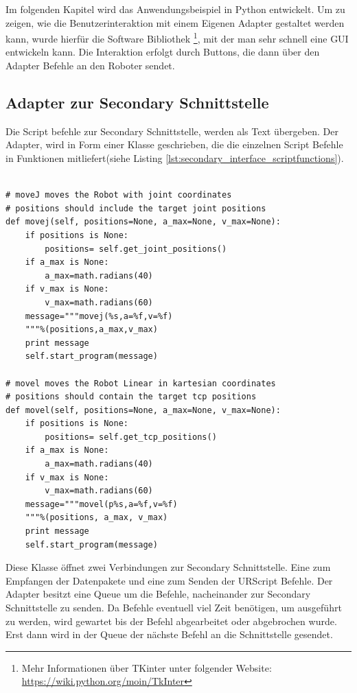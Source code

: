 Im folgenden Kapitel wird das Anwendungsbeispiel in Python entwickelt. Um zu zeigen, wie die Benutzerinteraktion mit einem Eigenen Adapter gestaltet werden kann, wurde hierfür die Software Bibliothek \footnote{Mehr Informationen über TKinter unter folgender Website: \url{https://wiki.python.org/moin/TkInter}}, mit der man sehr schnell eine \ac{GUI} entwickeln kann. Die Interaktion erfolgt durch Buttons, die dann über den Adapter Befehle an den Roboter sendet.

\subsection{Adapter zur Secondary Schnittstelle}
\label{beschreibung_script_hoeher_schicht}

Die Script befehle zur Secondary Schnittstelle, werden als Text übergeben. Der Adapter, wird in Form einer Klasse geschrieben, die die einzelnen Script Befehle in Funktionen mitliefert(siehe Listing \ref{lst:secondary_interface_scriptfunctions}).

\begin{lstlisting}[caption={Ausschnitt zeigt Funktionen die Scriptbefehle in der Adapter Klasse umgesetzt}, label=lst:urscipt_program_lst ,captionpos=b]

# moveJ moves the Robot with joint coordinates
# positions should include the target joint positions
def movej(self, positions=None, a_max=None, v_max=None):
    if positions is None:
        positions= self.get_joint_positions()
    if a_max is None:
        a_max=math.radians(40)
    if v_max is None:
        v_max=math.radians(60)
    message="""movej(%s,a=%f,v=%f)
    """%(positions,a_max,v_max)
    print message
    self.start_program(message)

# movel moves the Robot Linear in kartesian coordinates
# positions should contain the target tcp positions
def movel(self, positions=None, a_max=None, v_max=None):
    if positions is None:
        positions= self.get_tcp_positions()
    if a_max is None:
        a_max=math.radians(40)
    if v_max is None:
        v_max=math.radians(60)
    message="""movel(p%s,a=%f,v=%f)
    """%(positions, a_max, v_max)
    print message
    self.start_program(message)
\end{lstlisting}

Diese Klasse öffnet zwei Verbindungen zur Secondary Schnittstelle. Eine zum Empfangen der Datenpakete und eine zum Senden der URScript Befehle. Der Adapter besitzt eine \ac{Queue} um die Befehle, nacheinander zur Secondary Schnittstelle zu senden. Da Befehle eventuell viel Zeit benötigen, um ausgeführt zu werden, wird gewartet bis der Befehl abgearbeitet oder abgebrochen wurde. Erst dann wird in der Queue der nächste Befehl an die Schnittstelle gesendet.

